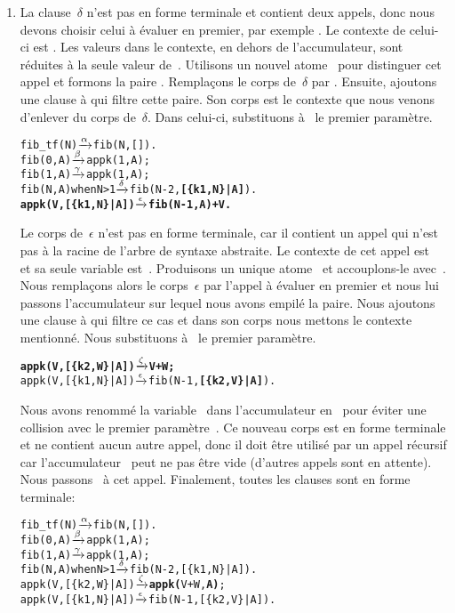 \begin{enumerate}
\item La clause~\(\delta\) n'est pas en forme terminale et contient
  deux appels, donc nous devons choisir celui à évaluer en premier,
  par exemple . Le contexte de celui-ci est
  . Les valeurs dans le
  contexte, en dehors de l'accumulateur, sont réduites à la seule
  valeur de~. Utilisons un nouvel atome~ pour
  distinguer cet appel et formons la paire
  . Remplaçons le corps de~\(\delta\) par
  . Ensuite, ajoutons une
  clause à  qui filtre cette paire. Son corps est le
  contexte que nous venons d'enlever du corps de~\(\delta\). Dans
  celui-ci, substituons à~\erlcode{\textvisiblespace} le premier paramètre.
\begin{alltt}
fib_tf(N)           \(\smashedrightarrow{\alpha}\) fib(N,[]).
fib(0,A)            \(\smashedrightarrow{\beta}\) appk(1,A);
fib(1,A)            \(\smashedrightarrow{\gamma}\) appk(1,A);
fib(N,A) when N > 1 \(\smashedrightarrow{\delta}\) fib(N-2,\textbf{[\{k1,N\}|A]}).
\textbf{appk(V,[\{k1,N\}|A])  \(\smashedrightarrow{\epsilon}\) fib(N-1,A) + V.}
\end{alltt}

  Le corps de~\(\epsilon\) n'est pas en forme terminale, car il contient
un appel qui n'est pas à la racine de l'arbre de syntaxe abstraite. Le
contexte de cet appel est~ et sa
seule variable est~. Produisons un unique
atome~ et accouplons-le avec~. Nous remplaçons
alors le corps~\(\epsilon\) par l'appel à évaluer en premier et nous
lui passons l'accumulateur sur lequel nous avons empilé la paire. Nous
ajoutons une clause à  qui filtre ce cas et dans son
corps nous mettons le contexte mentionné. Nous substituons
à~\erlcode{\textvisiblespace} le premier paramètre.
\begin{alltt}
\textbf{appk(V,[\{k2,W\}|A]) \(\smashedrightarrow{\zeta}\) V + W;}
appk(V,[\{k1,N\}|A]) \(\smashedrightarrow{\epsilon}\) fib(N-1,\textbf{[\{k2,V\}|A]}).
\end{alltt}
    Nous avons renommé la variable~ dans l'accumulateur
    en~ pour éviter une collision avec le premier
    paramètre~. Ce nouveau corps  est en forme
    terminale et ne contient aucun autre appel, donc il doit être
    utilisé par un appel récursif car l'accumulateur~ peut
    ne pas être vide (d'autres appels sont en attente). Nous
    passons~ à cet appel. Finalement, toutes les clauses
    sont en forme terminale:
\begin{alltt}
fib_tf(N)           \(\smashedrightarrow{\alpha}\) fib(N,[]).
fib(0,A)            \(\smashedrightarrow{\beta}\) appk(1,A);
fib(1,A)            \(\smashedrightarrow{\gamma}\) appk(1,A);
fib(N,A) when N > 1 \(\smashedrightarrow{\delta}\) fib(N-2,[\{k1,N\}|A]).
appk(V,[\{k2,W\}|A])  \(\smashedrightarrow{\zeta}\) \textbf{appk(}V+W,\textbf{A)};
appk(V,[\{k1,N\}|A])  \(\smashedrightarrow{\epsilon}\) fib(N-1,[\{k2,V\}|A]).
\end{alltt}


\end{enumerate}
